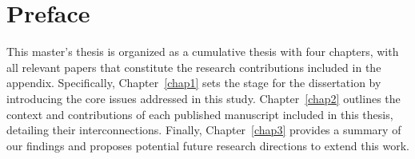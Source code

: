 \chapter*{Preface}

This master's thesis is organized as a cumulative thesis with four chapters, with all relevant papers that constitute the research contributions included in the appendix. Specifically, Chapter~\ref{chap1} sets the stage for the dissertation by introducing the core issues addressed in this study. Chapter~\ref{chap2} outlines the context and contributions of each published manuscript included in this thesis, detailing their interconnections. Finally, Chapter~\ref{chap3} provides a summary of our findings and proposes potential future research directions to extend this work.
